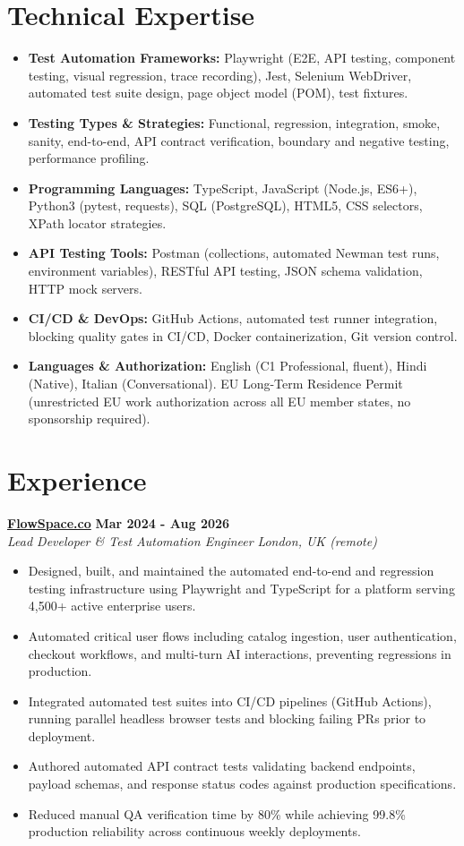 \documentclass[10pt,a4paper]{article}
\newcommand{\role}[4]{%
  \textbf{#1} \hfill \textbf{#2}\\[1pt]%
  \textit{#3} \hfill \textit{#4}\\[2pt]%
}
\begin{document}
\section{Technical Expertise}
\begin{itemize}
  \item \textbf{Test Automation Frameworks:} Playwright (E2E, API testing, component testing, visual regression, trace recording), Jest, Selenium WebDriver, automated test suite design, page object model (POM), test fixtures.
  \item \textbf{Testing Types \& Strategies:} Functional, regression, integration, smoke, sanity, end-to-end, API contract verification, boundary and negative testing, performance profiling.
  \item \textbf{Programming Languages:} TypeScript, JavaScript (Node.js, ES6+), Python3 (pytest, requests), SQL (PostgreSQL), HTML5, CSS selectors, XPath locator strategies.
  \item \textbf{API Testing Tools:} Postman (collections, automated Newman test runs, environment variables), RESTful API testing, JSON schema validation, HTTP mock servers.
  \item \textbf{CI/CD \& DevOps:} GitHub Actions, automated test runner integration, blocking quality gates in CI/CD, Docker containerization, Git version control.
  \item \textbf{Languages \& Authorization:} English (C1 Professional, fluent), Hindi (Native), Italian (Conversational). EU Long-Term Residence Permit (unrestricted EU work authorization across all EU member states, no sponsorship required).
\end{itemize}

\section{Experience}

\role{\href{https://flowspace.co}{FlowSpace.co}}{Mar 2024 - Aug 2026}{Lead Developer \& Test Automation Engineer}{London, UK (remote)}
\begin{itemize}
  \item Designed, built, and maintained the automated end-to-end and regression testing infrastructure using Playwright and TypeScript for a platform serving 4,500+ active enterprise users.
  \item Automated critical user flows including catalog ingestion, user authentication, checkout workflows, and multi-turn AI interactions, preventing regressions in production.
  \item Integrated automated test suites into CI/CD pipelines (GitHub Actions), running parallel headless browser tests and blocking failing PRs prior to deployment.
  \item Authored automated API contract tests validating backend endpoints, payload schemas, and response status codes against production specifications.
  \item Reduced manual QA verification time by 80\% while achieving 99.8\% production reliability across continuous weekly deployments.
\end{itemize}
\end{document}
